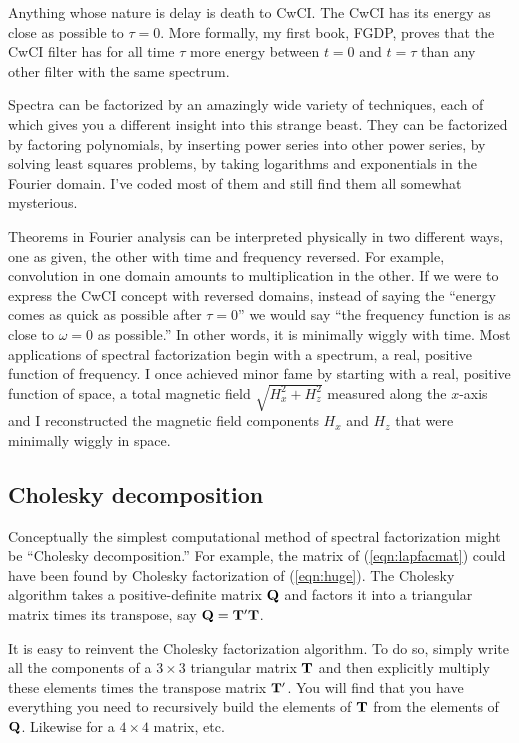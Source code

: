 \par
Anything whose nature is delay is death to CwCI.
The CwCI has its energy as close as possible to $\tau=0$.
More formally, my first book, FGDP, proves that the CwCI filter
has for all time $\tau$ more energy between $t=0$ and $t=\tau$
than any other filter with the same spectrum.

\par
Spectra can be factorized by an amazingly wide variety of techniques,
each of which gives you a different insight into this strange beast.
They can be factorized by factoring polynomials, by inserting power series
into other power series, by solving least squares problems,
by taking logarithms and exponentials in the Fourier domain.
I've coded most of them and still find them all somewhat mysterious.

\par
Theorems in Fourier analysis can be interpreted physically in two
different ways, one as given, the other with time and frequency reversed.
For example, convolution in one domain amounts to multiplication in the other.
If we were to express the CwCI concept with reversed domains,
instead of saying the ``energy comes as quick as possible after $\tau=0$''
we would say ``the frequency function is as close to $\omega=0$ as possible.''
In other words, it is minimally wiggly with time.
Most applications of spectral factorization begin with a spectrum,
a real, positive function of frequency.
I once achieved minor fame by starting with a real, positive function of space,
a total magnetic field $\sqrt{H_x^2 +H_z^2}$ measured along the $x$-axis
and I reconstructed the magnetic field components $H_x$ and $H_z$
that were minimally wiggly in space.






\subsection{Cholesky decomposition}
Conceptually the simplest computational method of spectral factorization
might be ``Cholesky decomposition.''
For example, the matrix of (\ref{eqn:lapfacmat})
could have been found by Cholesky factorization of (\ref{eqn:huge}).
The Cholesky algorithm takes a positive-definite matrix
$\bold Q$ and factors it into a triangular matrix
times its transpose,
say $\bold Q = \bold T' \bold T$.

\par
It is easy to reinvent the Cholesky factorization algorithm.
To do so,
simply write all the components of a $3\times 3$ triangular matrix
$\bold T$ and then explicitly multiply these elements
times the transpose matrix $\bold T'$.
You will find that you have everything you need
to recursively build the elements of $\bold T$
from the elements of $\bold Q$.
Likewise for a $4\times 4$ matrix, etc.

